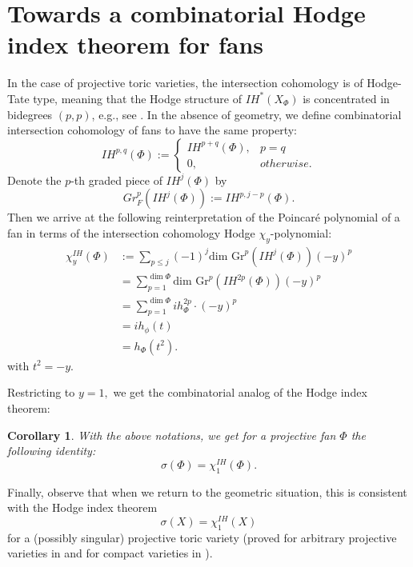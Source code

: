 \documentclass[12pt,leqno,twoside]{amsart}
\newtheorem{cor}{Corollary}[section]
\begin{document}
\section{Towards a combinatorial Hodge index theorem for fans}

In the case of projective toric varieties, the intersection cohomology is of Hodge-Tate type, meaning that the Hodge structure of $IH^*(X_\Phi)$ is concentrated in bidegrees $(p,p)$, e.g., see \cite{Sa, MS}. In the absence of geometry, we define combinatorial intersection cohomology of fans to have the same property: 
\[
IH^{p,q}(\Phi):= 
\begin{cases} 
IH^{p+q}(\Phi), & p=q \\ 
0, & otherwise.
\end{cases}
\] 
Denote the $p$-th graded piece of $IH^j(\Phi)$ by \[Gr_F^p(IH^j(\Phi)):=IH^{p,j-p}(\Phi).\] Then we arrive at the following reinterpretation of the Poincar\'e polynomial of a fan in terms of the intersection cohomology Hodge $\chi_y$-polynomial:
\begin{equation*}
    \begin{split}
    \chi^{IH}_y(\Phi)&:=\sum_{p\leq j}(-1)^j\text{dim Gr}^p(IH^j(\Phi))(-y)^p \\
    & =\sum_{p=1}^{\dim \Phi}\text{dim Gr}^p(IH^{2p}(\Phi))(-y)^p \\
    & =\sum_{p=1}^{\dim \Phi}ih_\Phi^{2p}\cdot(-y)^p \\
    &=ih_\phi(t) \\
    &=h_\Phi(t^2).
    \end{split}
\end{equation*}
with $t^2=-y$.

Restricting to $y=1,$ we get the combinatorial analog of the Hodge index theorem: 
\begin{cor}
   With the above notations, we get for a projective fan $\Phi$ the following identity:
   $$\sigma(\Phi)=\chi^{IH}_1(\Phi).$$
\end{cor}

Finally, observe that when we return to the geometric situation, this is consistent with the Hodge index theorem 
$$\sigma(X)=\chi^{IH}_1(X)$$
for a (possibly singular) projective toric variety (proved for arbitrary projective varieties in \cite{MSS} and for compact varieties in \cite{BPS}).
\end{document}
